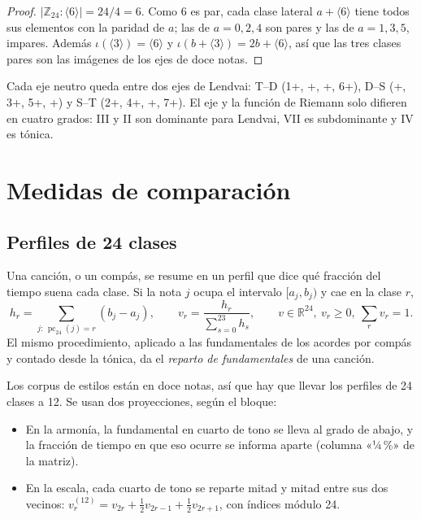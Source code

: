 \begin{proof}
$|\mathbb{Z}_{24} : \langle 6 \rangle| = 24/4 = 6$. Como $6$ es par, cada clase lateral $a + \langle 6 \rangle$ tiene todos
sus elementos con la paridad de $a$; las de $a = 0, 2, 4$ son pares y las de $a = 1, 3, 5$, impares. Además
$\iota(\langle 3 \rangle) = \langle 6 \rangle$ y $\iota(b + \langle 3 \rangle) = 2b + \langle 6 \rangle$, así que las tres
clases pares son las imágenes de los ejes de doce notas.
\end{proof}

Cada eje neutro queda entre dos ejes de Lendvai: T--D (1+, +, +, 6+), D--S (+, 3+, 5+, +) y S--T (2+, 4+,
+, 7+). El eje y la función de Riemann solo difieren en cuatro grados: III y \fl II son dominante para Lendvai, VII es
subdominante y \sh IV es tónica.

\section{Medidas de comparación}\label{sec:estadistica}

\subsection{Perfiles de 24 clases}

Una canción, o un compás, se resume en un perfil que dice qué fracción del tiempo suena cada clase. Si la nota $j$ ocupa
el intervalo $[a_j, b_j)$ y cae en la clase $r$,
\[
  h_r = \sum_{j:\, \operatorname{pc}_{24}(j) = r} (b_j - a_j), \qquad
  v_r = \frac{h_r}{\sum_{s=0}^{23} h_s}, \qquad v \in \mathbb{R}^{24},\ v_r \ge 0,\ \textstyle\sum_r v_r = 1.
\]
El mismo procedimiento, aplicado a las fundamentales de los acordes por compás y contado desde la tónica, da el
\emph{reparto de fundamentales} de una canción.

Los corpus de estilos están en doce notas, así que hay que llevar los perfiles de 24 clases a 12. Se usan dos
proyecciones, según el bloque:
\begin{itemize}
  \item En la armonía, la fundamental en cuarto de tono se lleva al grado de abajo, y la fracción de tiempo en que eso
  ocurre se informa aparte (columna «¼\,\%» de la matriz).
  \item En la escala, cada cuarto de tono se reparte mitad y mitad entre sus dos vecinos:
  $v^{(12)}_r = v_{2r} + \tfrac12 v_{2r-1} + \tfrac12 v_{2r+1}$, con índices módulo 24.
\end{itemize}

